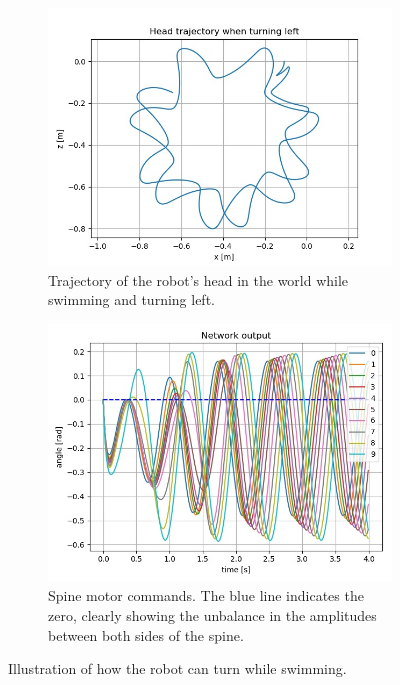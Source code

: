 \documentclass{cmc}
\begin{document}
\begin{figure}[!ht]
  \begin{subfigure}[b]{0.48\textwidth}
    \includegraphics[width=\textwidth]{figures/9d/turning_left_trajectory.jpg}
    \caption{Trajectory of the robot's head in the world while swimming and turning left.}
    \label{fig:9d_turning_traj}
  \end{subfigure}
  \begin{subfigure}[b]{0.48\textwidth}
    \includegraphics[width=\textwidth]{figures/9d/turning_left_spine_angles.jpg}
    \caption{Spine motor commands. The blue line indicates the zero, clearly showing the unbalance in the amplitudes between both sides of the spine.}
    \label{fig:9d_turning_angles}
  \end{subfigure}
  \caption{Illustration of how the robot can turn while swimming.}
  \label{fig:9d_turning}
\end{figure}
\end{document}
